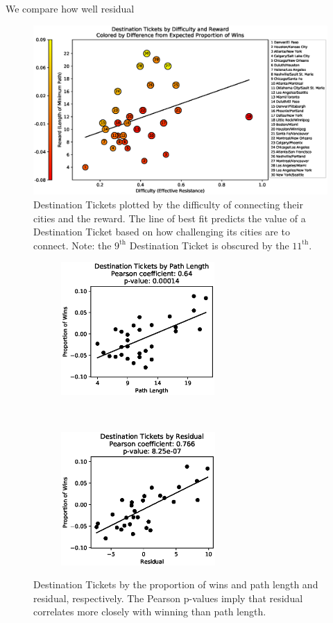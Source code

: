 We compare how well residual 

\begin{figure}[h]
    \centering
    \includegraphics[scale=.6]{figures/resistance_aggregate}
    \caption{Destination Tickets plotted by the
    difficulty of connecting their cities and the reward.
    The line of best fit predicts the value of a Destination
    Ticket based on how challenging its cities
    are to connect.
    Note: the $9^{\text{th}}$ Destination Ticket 
    is obscured by the $11^{\text{th}}$.}
    \label{fig:resistance}
\end{figure}

\begin{figure}[H]
    \centering
    \begin{subfigure}[t]{0.5\textwidth}
        \centering
        \includegraphics[height=2in]{figures/correlation0}
    \end{subfigure}%
    ~ 
    \begin{subfigure}[t]{0.5\textwidth}
        \centering
        \includegraphics[height=2in]{figures/correlation2}
    \end{subfigure}%
    \caption{Destination Tickets by the proportion of wins
    and path length and residual, respectively.
    The Pearson p-values imply that residual
    correlates more closely with winning than
    path length.}
    \label{fig:correlation}
\end{figure}

